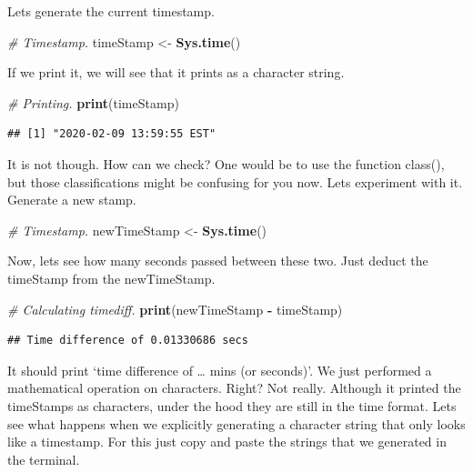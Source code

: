 \documentclass[]{book}
\newenvironment{Shaded}{\begin{snugshade}}{\end{snugshade}}
\newcommand{\CommentTok}[1]{\textcolor[rgb]{0.56,0.35,0.01}{\textit{#1}}}
\newcommand{\KeywordTok}[1]{\textcolor[rgb]{0.13,0.29,0.53}{\textbf{#1}}}
\newcommand{\NormalTok}[1]{#1}
\newcommand{\OperatorTok}[1]{\textcolor[rgb]{0.81,0.36,0.00}{\textbf{#1}}}
\newcommand{\StringTok}[1]{\textcolor[rgb]{0.31,0.60,0.02}{#1}}
\begin{document}
Lets generate the current timestamp.

\begin{Shaded}
\begin{Highlighting}[]
\CommentTok{# Timestamp.}
\NormalTok{timeStamp <-}\StringTok{ }\KeywordTok{Sys.time}\NormalTok{()}
\end{Highlighting}
\end{Shaded}

If we print it, we will see that it prints as a character string.

\begin{Shaded}
\begin{Highlighting}[]
\CommentTok{# Printing.}
\KeywordTok{print}\NormalTok{(timeStamp)}
\end{Highlighting}
\end{Shaded}

\begin{verbatim}
## [1] "2020-02-09 13:59:55 EST"
\end{verbatim}

It is not though. How can we check? One would be to use the function class(), but those classifications might be confusing for you now. Lets experiment with it. Generate a new stamp.

\begin{Shaded}
\begin{Highlighting}[]
\CommentTok{# Timestamp.}
\NormalTok{newTimeStamp <-}\StringTok{ }\KeywordTok{Sys.time}\NormalTok{()}
\end{Highlighting}
\end{Shaded}

Now, lets see how many seconds passed between these two. Just deduct the timeStamp from the newTimeStamp.

\begin{Shaded}
\begin{Highlighting}[]
\CommentTok{# Calculating timediff.}
\KeywordTok{print}\NormalTok{(newTimeStamp }\OperatorTok{-}\StringTok{ }\NormalTok{timeStamp)}
\end{Highlighting}
\end{Shaded}

\begin{verbatim}
## Time difference of 0.01330686 secs
\end{verbatim}

It should print `time difference of \ldots{} mins (or seconds)'. We just performed a mathematical operation on characters. Right? Not really. Although it printed the timeStamps as characters, under the hood they are still in the time format. Lets see what happens when we explicitly generating a character string that only looks like a timestamp. For this just copy and paste the strings that we generated in the terminal.
\end{document}
